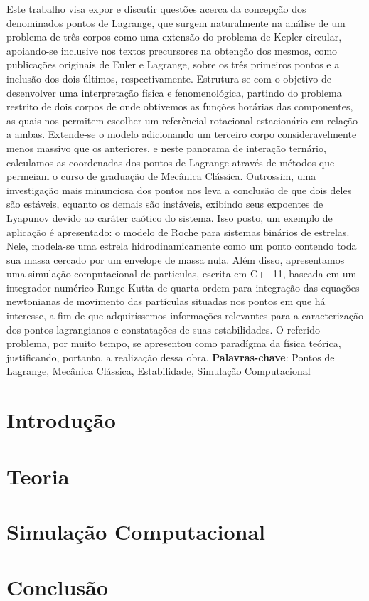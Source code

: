 \documentclass[10pt,twoside,a4paper,brazil]{abntex2}
\begin{document}
   \imprimircapa
   \imprimirfolhaderosto
   \tableofcontents

   \begin{resumo}
      Este trabalho visa expor e discutir questões acerca da concepção dos denominados pontos de Lagrange, que surgem naturalmente na análise de um problema de três corpos como uma extensão do problema de Kepler circular, apoiando-se inclusive nos textos precursores na obtenção dos mesmos, como publicações originais de Euler e Lagrange, sobre os três primeiros pontos e a inclusão dos dois últimos, respectivamente. Estrutura-se com o objetivo de desenvolver uma interpretação física e fenomenológica, partindo do problema restrito de dois corpos de onde obtivemos as funções horárias das componentes, as quais nos permitem escolher um referêncial rotacional estacionário em relação a ambas. Extende-se o modelo adicionando um terceiro corpo consideravelmente menos massivo que os anteriores, e neste panorama de interação ternário, calculamos as coordenadas dos pontos de Lagrange através de métodos que permeiam o curso de graduação de Mecânica Clássica. Outrossim, uma investigação mais minunciosa dos pontos nos leva a conclusão de que dois deles são estáveis, equanto os demais são instáveis, exibindo seus expoentes de Lyapunov devido ao caráter caótico do sistema. Isso posto, um exemplo de aplicação é apresentado: o modelo de Roche para sistemas binários de estrelas. Nele, modela-se uma estrela hidrodinamicamente como um ponto contendo toda sua massa cercado por um envelope de massa nula. Além disso, apresentamos uma simulação computacional de particulas, escrita em C++11, baseada em um integrador numérico Runge-Kutta de quarta ordem para integração das equações newtonianas de movimento das partículas situadas nos pontos em que há interesse, a fim de que adquiríssemos informações relevantes para a caracterização dos pontos lagrangianos e constatações de suas estabilidades. O referido problema, por muito tempo, se apresentou como paradígma da física teórica, justificando, portanto, a realização dessa obra.
      \vspace{\onelineskip}
      \noindent
      \textbf{Palavras-chave}: Pontos de Lagrange, Mecânica Clássica, Estabilidade, Simulação Computacional
   \end{resumo}

   \chapter{Introdução}
      
      
   \chapter{Teoria}
      
     
   \chapter{Simulação Computacional}
      

   \chapter{Conclusão}
      

   
\end{document}
